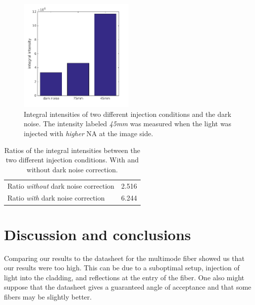 \documentclass[a4paper, 12pt]{paper}
\begin{document}
\begin{figure}[H]
    \centering
    \includegraphics[width=0.5\textwidth]{img/intensity_graph}
    \caption{Integral intensities of two different injection conditions and the dark noise.
        The intensity labeled \emph{45mm} was measured when the light was injected with \emph{higher} NA at the image side.}
    \label{fig:intensity_graph}
\end{figure}

\begin{table}[H]
    \centering
    \begin{tabular}{l S[table-format=1.3]}
        \toprule
        Ratio \emph{without} dark noise correction & 2.516 \\
        Ratio \emph{with} dark noise correction    & 6.244 \\
        \bottomrule
    \end{tabular}
    \caption{Ratios of the integral intensities between the two different injection conditions.
             With and without dark noise correction.}
\label{tab:injection_ratios}
\end{table}

\section{Discussion and conclusions}
Comparing our results to the datasheet for the multimode fiber showed us that our results
were too high. This can be due to a suboptimal setup, injection of light into the cladding, and reflections at the entry of the fiber.
One also might suppose that the datasheet gives a guaranteed angle of acceptance and that some fibers may be slightly better.
\end{document}
